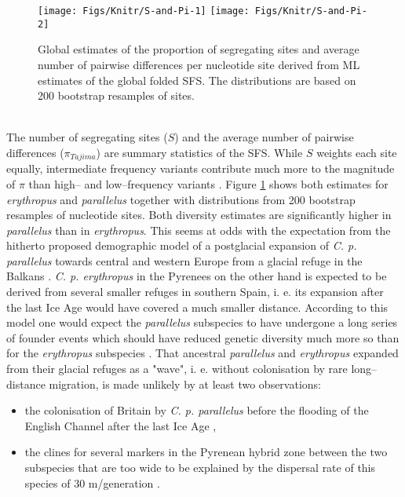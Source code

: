 \documentclass[a4paper,12pt,times,authoryear,twoside,print,index]{Classes/PhDThesisPSnPDF}\usepackage[]{graphicx}\usepackage[]{color}
\newenvironment{knitrout}{}{} %
\begin{document}
%
\begin{figure}[htb]
\centering
\begin{knitrout}
\color{fgcolor}

{\centering \texttt{[image: Figs/Knitr/S-and-Pi-1]} 
\texttt{[image: Figs/Knitr/S-and-Pi-2]} 

}



\end{knitrout}
\caption{Global estimates of the proportion of segregating sites and average number of pairwise differences per nucleotide site derived from ML estimates of the global folded \gls{SFS}. The distributions are based on 200 bootstrap resamples of sites.}
\label{Fig:S-and-Pi}
\end{figure}
%
\\
The number of segregating sites ($S$) and the average number of pairwise differences ($\pi_{Tajima}$) are summary statistics of the \gls{SFS}. While $S$ weights each site equally, intermediate frequency variants contribute much more to the magnitude of $\pi$ than high-- and low--frequency variants \cite[eq. 1.4]{Wakeley2009}. Figure \ref{Fig:S-and-Pi} shows both estimates for \textit{erythropus} and \textit{parallelus} together with distributions from 200 bootstrap resamples of nucleotide sites. Both diversity estimates are significantly higher in \textit{parallelus} than in \textit{erythropus}. This seems at odds with the expectation from the hitherto proposed demographic model of a postglacial expansion of \textit{C. p. parallelus} towards central and western Europe from a glacial refuge in the Balkans \citep{Cooper1995, Lunt1998}. \textit{C. p. erythropus} in the Pyrenees on the other hand is expected to be derived from several smaller refuges in southern Spain, i. e. its expansion after the last Ice Age would have covered a much smaller distance. According to this model one would expect the \textit{parallelus} subspecies to have undergone a long series of founder events which should have reduced genetic diversity much more so than for the \textit{erythropus} subspecies \citep{Luca2011}. That ancestral \textit{parallelus} and \textit{erythropus} expanded from their glacial refuges as a "wave", i. e. without colonisation by rare long--distance migration, is made unlikely by at least two observations: 
\begin{itemize}
\item the colonisation of Britain by \textit{C. p. parallelus} before the flooding of the English Channel after the last Ice Age \citep{Cooper1995},
\item the clines for several markers in the Pyrenean hybrid zone between the two subspecies that are too wide to be explained by the dispersal rate of this species of 30 m/generation \citep{Nichols1994}. 
\end{itemize}
\end{document}
